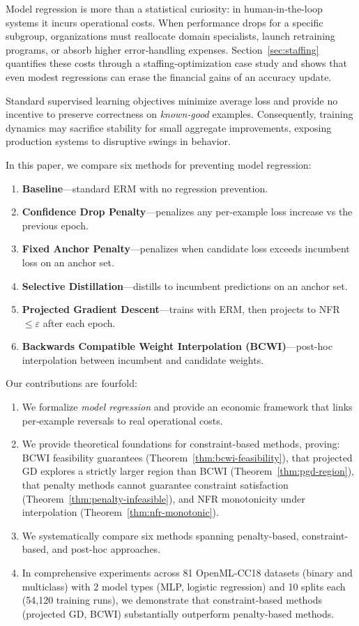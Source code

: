 \documentclass[12pt, letterpaper]{article}
\theoremstyle{remark}
\begin{document}
Model regression is more than a statistical curiosity: in human‑in‑the‑loop systems it incurs operational costs.  When performance drops for a specific subgroup, organizations must reallocate domain specialists, launch retraining programs, or absorb higher error‑handling expenses.  Section~\ref{sec:staffing} quantifies these costs through a staffing‑optimization case study and shows that even modest regressions can erase the financial gains of an accuracy update.

Standard supervised learning objectives minimize average loss and provide no incentive to preserve correctness on \emph{known‑good} examples.  Consequently, training dynamics may sacrifice stability for small aggregate improvements, exposing production systems to disruptive swings in behavior.

In this paper, we compare six methods for preventing model regression:
\begin{enumerate}
\item \textbf{Baseline}—standard ERM with no regression prevention.
\item \textbf{Confidence Drop Penalty}—penalizes any per-example loss increase vs the previous epoch.
\item \textbf{Fixed Anchor Penalty}—penalizes when candidate loss exceeds incumbent loss on an anchor set.
\item \textbf{Selective Distillation}—distills to incumbent predictions on an anchor set.
\item \textbf{Projected Gradient Descent}—trains with ERM, then projects to NFR $\leq \varepsilon$ after each epoch.
\item \textbf{Backwards Compatible Weight Interpolation (BCWI)}—post-hoc interpolation between incumbent and candidate weights.
\end{enumerate}

Our contributions are fourfold:
\begin{enumerate}
\item We formalize \emph{model regression} and provide an economic framework that links per‑example reversals to real operational costs.
\item We provide theoretical foundations for constraint-based methods, proving: BCWI feasibility guarantees (Theorem~\ref{thm:bcwi-feasibility}), that projected GD explores a strictly larger region than BCWI (Theorem~\ref{thm:pgd-region}), that penalty methods cannot guarantee constraint satisfaction (Theorem~\ref{thm:penalty-infeasible}), and NFR monotonicity under interpolation (Theorem~\ref{thm:nfr-monotonic}).
\item We systematically compare six methods spanning penalty-based, constraint-based, and post-hoc approaches.
\item In comprehensive experiments across 81 OpenML-CC18 datasets (binary and multiclass) with 2 model types (MLP, logistic regression) and 10 splits each (54,120 training runs), we demonstrate that constraint-based methods (projected GD, BCWI) substantially outperform penalty-based methods.
\end{enumerate}
\end{document}
